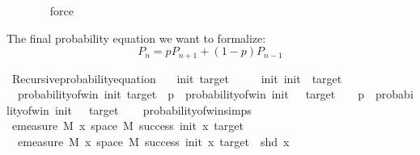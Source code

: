 \begin{isabellebody}
\ \ \ \ \ \ \isamarkupfalse%
\ force\isanewline
\ \ \isamarkupfalse%
%
\endisatagproof
{\isafoldproof}%
%
\isadelimproof
%
\endisadelimproof
%
\isadelimdocument
%
\endisadelimdocument
%
\isatagdocument
%
\isamarkuptrue%
%
\endisatagdocument
{\isafolddocument}%
%
\isadelimdocument
%
\endisadelimdocument
%
\begin{isamarkuptext}%
The final probability equation we want to formalize: $$P_n = pP_{n+1} + (1-p)P_{n-1}$$%
\end{isamarkuptext}\isamarkuptrue%
\isamarkupfalse%
\ Recursive{\isacharunderscore}{\kern0pt}probability{\isacharunderscore}{\kern0pt}equation{\isacharcolon}{\kern0pt}\isanewline
\ \ \ init\ target\isanewline
\ \ \ {\isachardoublequoteopen}{}\ {\isacharless}{\kern0pt}\ init{\isachardoublequoteclose}\ {\isachardoublequoteopen}init\ {\isacharless}{\kern0pt}\ target{\isachardoublequoteclose}\isanewline
\ \ probability{\isacharunderscore}{\kern0pt}of{\isacharunderscore}{\kern0pt}win\ init\ target\ {\isacharequal}{\kern0pt}\ p\ {\isacharasterisk}{\kern0pt}\ {\isacharparenleft}{\kern0pt}probability{\isacharunderscore}{\kern0pt}of{\isacharunderscore}{\kern0pt}win\ {\isacharparenleft}{\kern0pt}init\ {\isacharplus}{\kern0pt}\ {}{\isacharparenright}{\kern0pt}\ target{\isacharparenright}{\kern0pt}\ {\isacharplus}{\kern0pt}\ {\isacharparenleft}{\kern0pt}{}\ {\isacharminus}{\kern0pt}\ p{\isacharparenright}{\kern0pt}\ {\isacharasterisk}{\kern0pt}\ {\isacharparenleft}{\kern0pt}probability{\isacharunderscore}{\kern0pt}of{\isacharunderscore}{\kern0pt}win\ {\isacharparenleft}{\kern0pt}init\ {\isacharminus}{\kern0pt}\ {}{\isacharparenright}{\kern0pt}\ target{\isacharparenright}{\kern0pt}{\isachardoublequoteclose}\isanewline
%
\isadelimproof
\ \ %
\endisadelimproof
%
\isatagproof
{}\isamarkupfalse%
\ probability{\isacharunderscore}{\kern0pt}of{\isacharunderscore}{\kern0pt}win{\isachardot}{\kern0pt}simps\isanewline
{}\isamarkupfalse%
{\isacharminus}{\kern0pt}\isanewline
\ \ \isamarkupfalse%
\ {\isachardoublequoteopen}emeasure\ M\ {\isacharbraceleft}{\kern0pt}x{\isasymin}\ space\ M{\isachardot}{\kern0pt}\ success\ init\ x\ target{\isacharbraceright}{\kern0pt}\isanewline
\ {\isacharequal}{\kern0pt}\ emeasure\ M\ {\isacharbraceleft}{\kern0pt}x{\isasymin}\ space\ M{\isachardot}{\kern0pt}\ success\ init\ x\ target\ {\isasymand}\ shd\ x{\isacharbraceright}{\kern0pt}\ \isanewline

\end{isabellebody}
